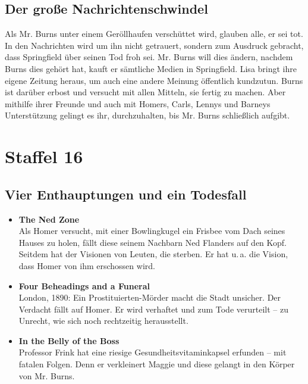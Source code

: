 \subsection{Der große Nachrichtenschwindel}
Als Mr. Burns unter einem Geröllhaufen verschüttet wird, glauben alle, er sei tot. In den Nachrichten wird um ihn nicht getrauert, sondern zum Ausdruck gebracht, dass Springfield über seinen Tod froh sei. Mr. Burns will dies ändern, nachdem Burns dies gehört hat, kauft er sämtliche Medien in Springfield. Lisa bringt ihre eigene Zeitung heraus, um auch eine andere Meinung öffentlich kundzutun. Burns ist darüber erbost und versucht mit allen Mitteln, sie fertig zu machen. Aber mithilfe ihrer Freunde und auch mit Homers, Carls, Lennys und Barneys Unterstützung gelingt es ihr, durchzuhalten, bis Mr. Burns schließlich aufgibt.



\section{Staffel 16}
 	
\subsection{Vier Enthauptungen und ein Todesfall}
\begin{itemize}
	\item \textbf{The Ned Zone}\\ Als Homer versucht, mit einer Bowlingkugel ein Frisbee vom Dach seines Hauses zu holen, fällt diese seinem Nachbarn Ned Flanders auf den Kopf. Seitdem hat der Visionen von Leuten, die sterben. Er hat u.\,a. die Vision, dass Homer von ihm erschossen wird.
	\item \textbf{Four Beheadings and a Funeral}\\ London, 1890: Ein Prostituierten-Mörder macht die Stadt unsicher. Der Verdacht fällt auf Homer. Er wird verhaftet und zum Tode verurteilt -- zu Unrecht, wie sich noch rechtzeitig herausstellt. 
	\item \textbf{In the Belly of the Boss} \\ Professor Frink hat eine riesige Gesundheitsvitaminkapsel erfunden -- mit fatalen Folgen. Denn er verkleinert Maggie und diese gelangt in den Körper von Mr. Burns. 
\end{itemize}

